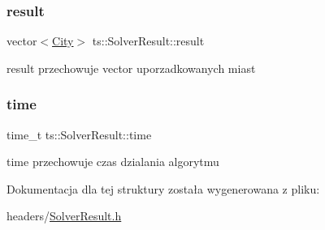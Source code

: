 \subsubsection{\texorpdfstring{result}{result}}
{\footnotesize\ttfamily vector$<$\mbox{\hyperlink{classts_1_1_city}{City}}$>$ ts\+::\+Solver\+Result\+::result}

result przechowuje vector uporzadkowanych miast \mbox{\label{structts_1_1_solver_result_a67b394211ddb67c3350920de2596fecf}} 
\subsubsection{\texorpdfstring{time}{time}}
{\footnotesize\ttfamily time\+\_\+t ts\+::\+Solver\+Result\+::time}

time przechowuje czas dzialania algorytmu 

Dokumentacja dla tej struktury została wygenerowana z pliku\+:\begin{DoxyCompactItemize}
\item 
headers/\mbox{\hyperlink{_solver_result_8h}{Solver\+Result.\+h}}\end{DoxyCompactItemize}
